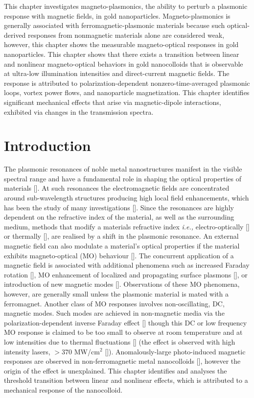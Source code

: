 This chapter investigates magneto-plasmonics, the ability to perturb a plasmonic response with magnetic fields, in gold nanoparticles. Magneto-plasmonics is generally associated with ferromagnetic-plasmonic materials because such optical-derived responses from nonmagnetic materials alone are considered weak, however, this chapter shows the measurable magneto-optical responses in gold nanoparticles. This chapter shows that there exists a transition between linear and nonlinear magneto-optical behaviors in gold nanocolloids that is observable at ultra-low illumination intensities and direct-current magnetic fields. The response is attributed to polarization-dependent nonzero-time-averaged plasmonic loops, vortex power flows, and nanoparticle magnetization. This chapter identifies significant mechanical effects that arise via magnetic-dipole interactions, exhibited via changes in the transmission spectra.

\section{Introduction}
The plasmonic resonances of noble metal nanostructures manifest in the visible spectral range and have a fundamental role in shaping the optical properties of materials [\cite{Link,Cortie}]. At such resonances the electromagnetic fields are concentrated around sub-wavelength structures producing high local field enhancements, which has been the study of many investigations [\cite{Barnes,Kelly03,Ozbay}]. Since the resonances are highly dependent on the refractive index of the material, as well as the surrounding medium, methods that modify a materials refractive index \textit{i.e.,} electro-optically [\cite{Dicken,Chyou}] or thermally [\cite{Nikolajsen}], are realised by a shift in the plasmonic resonance. An external magnetic field can also modulate a material's optical properties if the material exhibits magneto-optical (MO) behaviour [\cite{Temnov,Gonzalez,Deng}]. The concurrent application of a magnetic field is associated with additional phenomena such as increased Faraday rotation [\cite{Du}], MO enhancement of localized and propagating surface plasmons [\cite{Sepulveda,Torrado}], or introduction of new magnetic modes [\cite{Pineider,Tang,FanSci}]. Observations of these MO phenomena, however, are generally small unless the plasmonic material is mated with a ferromagnet. Another class of MO responses involves non-oscillating, DC, magnetic modes. Such modes are achieved in non-magnetic media via the polarization-dependent inverse Faraday effect [\cite{Hertel}] though this DC or low frequency MO response is claimed to be too small to observe at room temperature and at low intensities due to thermal fluctuations [\cite{Gu}] (the effect is observed with high intensity lasers, $>$370 MW/cm$^2$ [\cite{Raja}]). Anomalously-large photo-induced magnetic responses are observed in non-ferromagnetic metal nanocolloids [\cite{Singh}], however the origin of the effect is unexplained. This chapter identifies and analyses the threshold transition between linear and nonlinear effects, which is attributed to a mechanical response of the nanocolloid.

